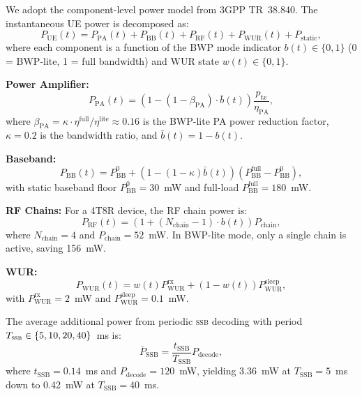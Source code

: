 \documentclass[conference]{IEEEtran}
\newcommand{\ssb}{\textsc{ssb}}
\begin{document}
We adopt the component-level power model from 3GPP TR~38.840.
The instantaneous UE power is decomposed as:
\begin{equation}
  P_{\mathrm{UE}}(t) = P_{\mathrm{PA}}(t) + P_{\mathrm{BB}}(t)
                     + P_{\mathrm{RF}}(t) + P_{\mathrm{WUR}}(t)
                     + P_{\mathrm{static}},
  \label{eq:power_model}
\end{equation}
where each component is a function of the BWP mode indicator
$b(t) \in \{0,1\}$ (0 = BWP-lite, 1 = full bandwidth) and WUR state
$w(t) \in \{0,1\}$.

\textbf{Power Amplifier:}
\begin{equation}
  P_{\mathrm{PA}}(t) = \left(1 - (1-\beta_{\mathrm{PA}}) \cdot \bar{b}(t)\right)
                       \frac{p_{tx}}{\eta_{\mathrm{PA}}},
  \label{eq:pa}
\end{equation}
where $\beta_{\mathrm{PA}} = \kappa \cdot \eta^{\mathrm{full}}/\eta^{\mathrm{lite}}
\approx 0.16$ is the BWP-lite PA power reduction factor,
$\kappa = 0.2$ is the bandwidth ratio, and $\bar{b}(t) = 1 - b(t)$.

\textbf{Baseband:}
\begin{equation}
  P_{\mathrm{BB}}(t) = P_{\mathrm{BB}}^{0}
    + \left(1 - (1-\kappa)\bar{b}(t)\right)
      \left(P_{\mathrm{BB}}^{\mathrm{full}} - P_{\mathrm{BB}}^{0}\right),
  \label{eq:bb}
\end{equation}
with static baseband floor $P_{\mathrm{BB}}^{0} = 30$~mW and full-load
$P_{\mathrm{BB}}^{\mathrm{full}} = 180$~mW.

\textbf{RF Chains:}
For a 4T8R device, the RF chain power is:
\begin{equation}
  P_{\mathrm{RF}}(t) = \left(1 + (N_{\mathrm{chain}}-1) \cdot b(t)\right)
                        P_{\mathrm{chain}},
  \label{eq:rf}
\end{equation}
where $N_{\mathrm{chain}} = 4$ and $P_{\mathrm{chain}} = 52$~mW.
In BWP-lite mode, only a single chain is active, saving 156~mW.

\textbf{WUR:}
\begin{equation}
  P_{\mathrm{WUR}}(t) = w(t) P_{\mathrm{WUR}}^{\mathrm{rx}}
                      + (1-w(t)) P_{\mathrm{WUR}}^{\mathrm{sleep}},
  \label{eq:wur_power}
\end{equation}
with $P_{\mathrm{WUR}}^{\mathrm{rx}} = 2$~mW and
$P_{\mathrm{WUR}}^{\mathrm{sleep}} = 0.1$~mW.

The average additional power from periodic \ssb{} decoding with period
$T_{\ssb{}} \in \{5, 10, 20, 40\}$~ms is:
\begin{equation}
  \bar{P}_{\mathrm{SSB}} = \frac{t_{\mathrm{SSB}}}{T_{\mathrm{SSB}}}
                            P_{\mathrm{decode}},
  \label{eq:ssb_power}
\end{equation}
where $t_{\mathrm{SSB}} = 0.14$~ms and $P_{\mathrm{decode}} = 120$~mW,
yielding 3.36~mW at $T_{\mathrm{SSB}} = 5$~ms down to 0.42~mW at
$T_{\mathrm{SSB}} = 40$~ms.
\end{document}
